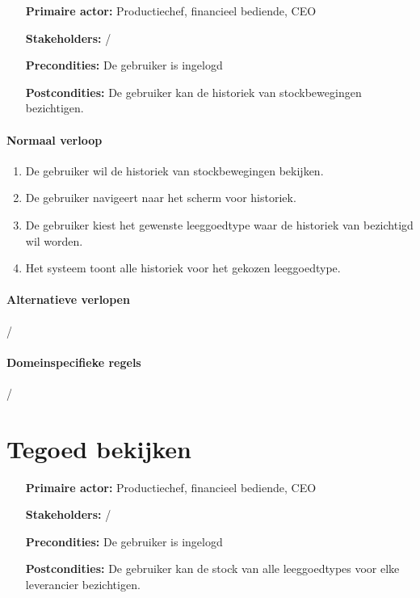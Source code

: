     \begin{itemize}[leftmargin=3.5cm, labelsep=0.5cm, nosep]
        \item[\textbf{Primaire actor:}] Productiechef, financieel bediende, CEO
        \item[\textbf{Stakeholders:}] /
        \item[\textbf{Precondities:}] De gebruiker is ingelogd
        \item[\textbf{Postcondities:}] De gebruiker kan de historiek van stockbewegingen bezichtigen.
    \end{itemize}

    \paragraph{Normaal verloop}
    \begin{enumerate}[nosep]
        \item De gebruiker wil de historiek van stockbewegingen bekijken.
        \item De gebruiker navigeert naar het scherm voor historiek.
        \item De gebruiker kiest het gewenste leeggoedtype waar de historiek van bezichtigd wil worden.
        \item Het systeem toont alle historiek voor het gekozen leeggoedtype.
    \end{enumerate}

    \paragraph{Alternatieve verlopen}
    /

    \paragraph{Domeinspecifieke regels}
    /

    \vspace{1cm}

\section{Tegoed bekijken}
\label{uc:tegoed-bekijken}

    \vspace{0.5em}

    \begin{itemize}[leftmargin=3.5cm, labelsep=0.5cm, nosep]
        \item[\textbf{Primaire actor:}] Productiechef, financieel bediende, CEO
        \item[\textbf{Stakeholders:}] /
        \item[\textbf{Precondities:}] De gebruiker is ingelogd
        \item[\textbf{Postcondities:}] De gebruiker kan de stock van alle leeggoedtypes voor elke leverancier bezichtigen.
    \end{itemize}

